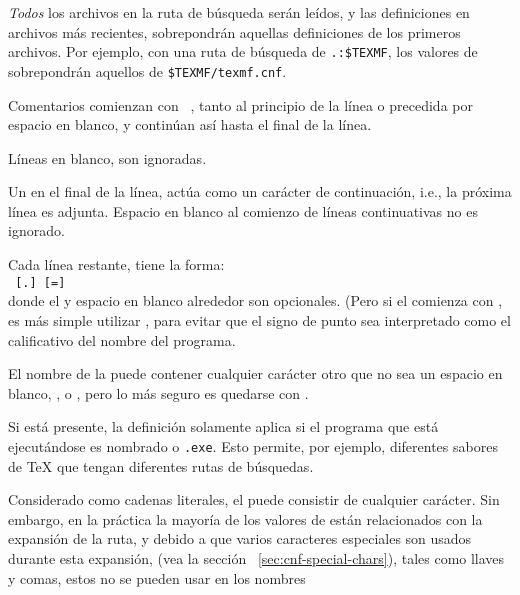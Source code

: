\documentclass{article}
\begin{document}
\emph{Todos} los archivos  en la ruta de
búsqueda serán leídos, y las definiciones en archivos más
recientes, sobrepondrán aquellas definiciones de los primeros archivos. Por
ejemplo, con una ruta de búsqueda de \verb|.:$TEXMF|, los
valores de  sobrepondrán aquellos de
\verb|$TEXMF/texmf.cnf|.

\begin{itemize*}
	\item 
		Comentarios comienzan con ~\code{\%}, tanto al principio de la línea o precedida por espacio en blanco, y continúan así hasta el final de la línea.
		 
		\item
			Líneas en blanco, son ignoradas.
		\item
			Un \bs{} en el final de la línea,
			actúa como un carácter de
			continuación, i.e., la próxima línea
			es adjunta. Espacio en blanco al
			comienzo de líneas continuativas no es
			ignorado. 
		\item
			Cada línea restante, tiene la forma:\\
\hspace*{2em}\texttt{ \textrm{[}.\textrm{]}
  \textrm{[}=\textrm{]} }\\[1pt]
			donde el \samp{=} y espacio en blanco
			alrededor son opcionales. 
			(Pero si el  comienza con , es más simple utilizar \samp{=}, para evitar que el signo de punto sea interpretado como el calificativo del nombre del programa.
		\item
			El nombre de la  puede
			contener cualquier carácter otro que
			no sea un espacio en blanco, \samp{=},
			o , pero lo más seguro es
			quedarse con .
		\item
			Si  está
			presente, la definición solamente
			aplica si el programa que está
			ejecutándose es nombrado
			\texttt{} o
			\texttt{.exe}. Esto 
			permite, por ejemplo, diferentes
			sabores de \TeX{} que tengan
			diferentes rutas de búsquedas.  
		\item  Considerado como cadenas literales, el
			 puede consistir de cualquier
			carácter. Sin embargo, en la práctica la mayoría
			de los valores de  están
			relacionados con la expansión de la ruta, y
			debido a que varios caracteres especiales son
			usados durante esta expansión, (vea la sección
			~\ref{sec:cnf-special-chars}), tales como llaves
			y comas, estos no se pueden usar en los nombres

\end{itemize*}
\end{document}
